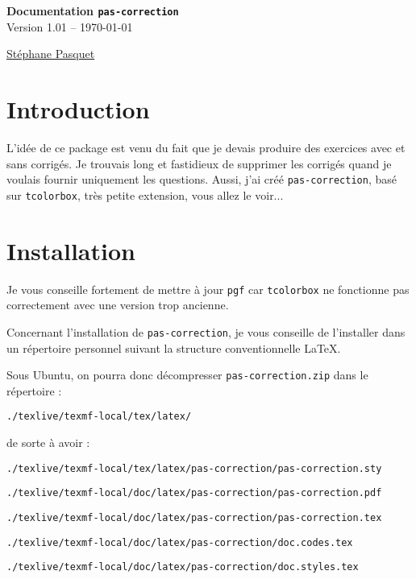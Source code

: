 \documentclass[a4paper,french]{article}
\begin{document}
\begin{center}
\begin{tcolorbox}[head]
{\bfseries\LARGE Documentation \texttt{pas-correction} }\\[3mm]
{\large Version 1.01 -- \today}
\end{tcolorbox}

{\large 
\href{http://www.mathweb.fr/contact.html}{Stéphane Pasquet}}
\end{center}

\begin{tcolorbox}[toc]
\makeatletter
{}
\makeatother
\end{tcolorbox}

\section{Introduction}

L'idée de ce package est venu du fait que je devais produire des exercices avec et sans corrigés. Je trouvais long et fastidieux de supprimer les corrigés quand je voulais fournir uniquement les questions. Aussi, j'ai créé \texttt{pas-correction}, basé sur \texttt{tcolorbox}, très petite extension, vous allez le voir...

\section{Installation}

Je vous conseille fortement de mettre à jour \texttt{pgf} car \texttt{tcolorbox} ne fonctionne pas correctement avec une version trop ancienne.

Concernant l'installation de \texttt{pas-correction}, je vous conseille de l'installer dans un répertoire personnel suivant la structure conventionnelle \LaTeX.

\medskip

Sous Ubuntu, on pourra donc décompresser \texttt{pas-correction.zip} dans le répertoire :

\begin{verbatim}
./texlive/texmf-local/tex/latex/
\end{verbatim}

de sorte à avoir :

\begin{verbatim}
./texlive/texmf-local/tex/latex/pas-correction/pas-correction.sty
\end{verbatim}
\begin{verbatim}
./texlive/texmf-local/doc/latex/pas-correction/pas-correction.pdf
\end{verbatim}
\begin{verbatim}
./texlive/texmf-local/doc/latex/pas-correction/pas-correction.tex
\end{verbatim}
\begin{verbatim}
./texlive/texmf-local/doc/latex/pas-correction/doc.codes.tex
\end{verbatim}
\begin{verbatim}
./texlive/texmf-local/doc/latex/pas-correction/doc.styles.tex
\end{verbatim}
\end{document}
